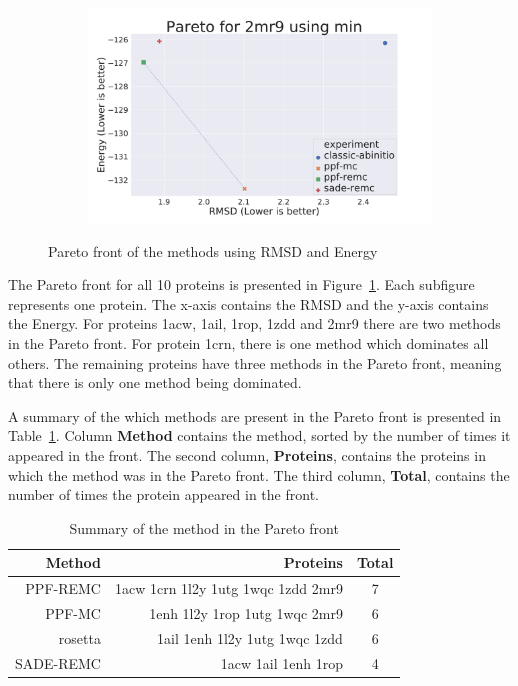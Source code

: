 \begin{figure}
\begin{subfigure}{0.49\linewidth}
  \end{subfigure}
%
  \begin{subfigure}{0.49\linewidth}
    \includegraphics[width=1\linewidth]{Figuras/pareto/2mr9_best_by_rmsd_min.pdf}
  \end{subfigure}
  \caption{Pareto front of the methods using RMSD and Energy}
  \label{fig:pareto-front}
\end{figure}

The Pareto front for all 10 proteins is presented in
Figure~\ref{fig:pareto-front}. Each subfigure represents one protein.
The x-axis contains the RMSD and the y-axis contains the Energy. For proteins 1acw,
1ail, 1rop, 1zdd and 2mr9 there are two methods in the Pareto front. For
protein 1crn, there is one method which dominates all others. The remaining
proteins have three methods in the Pareto front, meaning that there is only one
method being dominated.

A summary of the which methods are present in the Pareto front is presented
in Table~\ref{tab:pareto-front-summary}. Column \textbf{Method} contains the method,
sorted by the number of times it appeared in the front. The second column,
\textbf{Proteins}, contains the proteins in which the method was in the Pareto front.
The third column, \textbf{Total}, contains the number of times the protein appeared in the
front.

\begin{table}
  \centering
  \begin{tabular}{r | r | c}
    Method    & Proteins                           & Total \\ \hline \hline
    PPF-REMC  & 1acw 1crn 1l2y 1utg 1wqc 1zdd 2mr9 & 7     \\ \hline
    PPF-MC    & 1enh 1l2y 1rop 1utg 1wqc 2mr9      & 6     \\ \hline
    rosetta   & 1ail 1enh 1l2y 1utg 1wqc 1zdd      & 6     \\ \hline
    SADE-REMC & 1acw 1ail 1enh 1rop                & 4     \\
  \end{tabular}
  \caption{Summary of the method in the Pareto front}
  \label{tab:pareto-front-summary}
\end{table}

